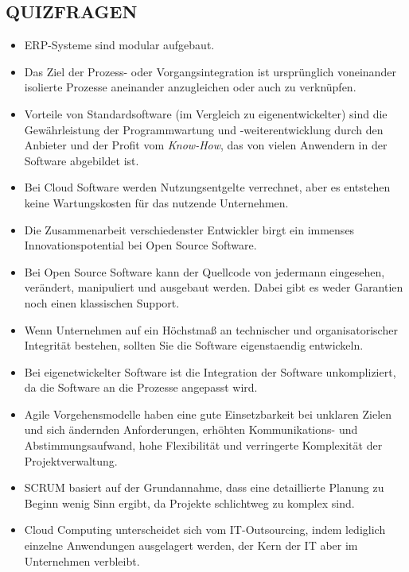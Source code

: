 \documentclass[12pt,a4paper]{article}
\begin{document}
\subsection{QUIZFRAGEN} %
\begin{itemize}
   \item ERP-Systeme sind modular aufgebaut.
   
   \item Das Ziel der Prozess- oder Vorgangsintegration ist ursprünglich voneinander isolierte Prozesse aneinander anzugleichen oder auch zu verknüpfen.
   
   \item Vorteile von Standardsoftware (im Vergleich zu eigenentwickelter) sind die Ge\-währ\-leis\-tung der Programmwartung und -weiterentwicklung durch den Anbieter und der Profit vom \emph{Know-How}, das von vielen Anwendern in der Software abgebildet ist.
   
   \item  Bei Cloud Software werden Nutzungsentgelte verrechnet, aber es entstehen keine Wartungskosten für das nutzende Unternehmen.
   
   \item Die Zusammenarbeit verschiedenster Entwickler birgt ein immenses Innovationspotential bei Open Source Software.
   \item Bei Open Source Software kann der Quellcode von jedermann eingesehen, verändert, manipuliert und ausgebaut werden.
         Dabei gibt es weder Garantien noch einen klassischen Support.
         
   \item Wenn Unternehmen auf ein Höchstmaß an technischer und organisatorischer Integrität bestehen, sollten Sie die Software eigenstaendig entwickeln.
   \item Bei eigenetwickelter Software ist die Integration der Software unkompliziert, da die Software an die Prozesse angepasst wird.
   
   \item Agile Vorgehensmodelle haben eine gute Einsetzbarkeit bei unklaren Zielen und sich ändernden Anforderungen, erhöhten Kommunikations- und Abstimmungsaufwand, hohe Flexibilität und verringerte Komplexität der Projektverwaltung.
   
   \item SCRUM basiert auf der Grundannahme, dass eine detaillierte Planung zu Beginn wenig Sinn ergibt, da Projekte schlichtweg zu komplex sind.
   
   \item Cloud Computing unterscheidet sich vom IT-Outsourcing, indem lediglich einzelne Anwendungen ausgelagert werden, der Kern der IT aber im Unternehmen verbleibt.
\end{itemize}
\end{document}
